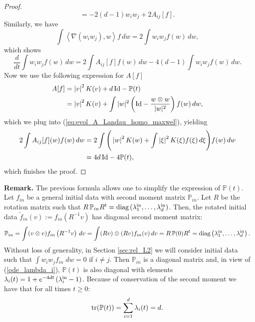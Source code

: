 \documentclass[11pt]{amsart}
\numberwithin{equation}{section}
\begin{document}
\begin{proof}
\begin{equation*}
    =-2(d-1)w_{i}w_j+2A_{ij}[f].
  \end{equation*}
  Similarly, we have
  \begin{equation*}
    \int\left\langle \nabla(w_{i}w_{j}),w \right\rangle f\,dw=2\int w_{i}w_{j}f(w)\,dw,
  \end{equation*}
  which shows 
  \begin{equation}\label{eq:evol_A_Landau_homo_maxwel}
    \frac{d}{dt}\int w_{i}w_{j}f(w)\,dw=2\int A_{ij}[f]f(w)\,dw-4(d-1)\int w_{i}w_{j}f(w)\,dw.
  \end{equation}
  Now we use the following expression for $A[f]$
  \begin{align*}
    A[f] &	=\left\vert v\right\vert ^{2}K(v)+d\,\textnormal{Id}- \mathbb{P}(t) \\
    & =\left\vert v\right\vert ^{2}K(v)
    +\int\vert w\vert^{2}\left(\textnormal{Id}-\frac{w\otimes w}{\vert w\vert^{2}}\right)f(w)\,dw,
  \end{align*}
  which we plug into (\ref{eq:evol_A_Landau_homo_maxwel}), yielding
  \begin{align*}
    2\int A_{ij}[f](w)f(w)\,dw & =2\int\Bigg(\left\vert w \right\vert ^{2}K(w)+\int\left\vert \xi \right\vert ^{2}K(\xi)f(\xi)\,d\xi\Bigg)f(w)\,dw\\
      & =4d\,\textnormal{Id}-4\mathbb{P}(t),
  \end{align*}
  which finishes the proof.
\end{proof}
%
%
{\bf{Remark.}} The previous formula allows one to simplify the expression of $\mathbb{P}(t)$. Let $f_{in}$ be a general initial data with second moment matrix $ \mathbb{P}_{in}$. Let $R$ be the  rotation matrix such that $R\, \mathbb{P}_{in} R^{t}=\textnormal{diag}\left(\lambda_{1}^{\textnormal{in}},\ldots,\lambda_{d}^{\textnormal{in}}\right)$. Then,  the rotated initial data $\tilde{f}_{in}(v):=f_{in}\left(R^{-1}v\right)$ has diagonal second moment matrix: 
\begin{equation*}
  \mathbb{P}_{in}=\int(v\otimes v)f_{in}\left(R^{-1}v\right)\,dv=\int(Rv)\otimes(Rv)f_{in}(v)\,dv=R\,\mathbb{P}(0)R^{t}
  =\textnormal{diag}\left(\lambda_{1}^{\textnormal{in}},\ldots,\lambda_{d}^{\textnormal{in}}\right).
\end{equation*}
Without loss of generality, in Section \ref{sec:rel_L2} we will consider initial data such that $ \int w_i w_j f_{in} \;dw =0$ if $ i \neq j$. Then $\mathbb{P}_{in}$ is a diagonal matrix and, in view of (\ref{ode_lambda_i}), $\mathbb{P}(t)$ is also diagonal with elements $\lambda_{i}(t)=1+e^{-4dt}\left(\lambda_{i}^{\textnormal{in}}-1\right)$. Because of conservation of the second moment we have that  for all times $t\ge 0 $:
$$
\textnormal{tr}( \mathbb{P}(t)) = \sum_{i =1}^d \lambda_i(t) = d.
$$  
\end{document}
